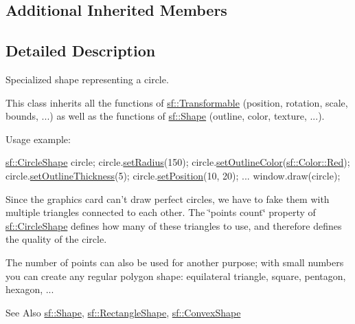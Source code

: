\subsection*{Additional Inherited Members}


\subsection{Detailed Description}
Specialized shape representing a circle. 

This class inherits all the functions of \hyperlink{classsf_1_1_transformable}{sf\-::\-Transformable} (position, rotation, scale, bounds, ...) as well as the functions of \hyperlink{classsf_1_1_shape}{sf\-::\-Shape} (outline, color, texture, ...).

Usage example\-: 
\begin{DoxyCode}
\hyperlink{classsf_1_1_circle_shape}{sf::CircleShape} circle;
circle.\hyperlink{classsf_1_1_circle_shape_a21cdf85fc2f201e10222a241af864be0}{setRadius}(150);
circle.\hyperlink{classsf_1_1_shape_a5978f41ee349ac3c52942996dcb184f7}{setOutlineColor}(\hyperlink{classsf_1_1_color_a7052b1c5408a953e25f9691e0e828c9d}{sf::Color::Red});
circle.\hyperlink{classsf_1_1_shape_a5ad336ad74fc1f567fce3b7e44cf87dc}{setOutlineThickness}(5);
circle.\hyperlink{classsf_1_1_transformable_a4dbfb1a7c80688b0b4c477d706550208}{setPosition}(10, 20);
...
window.draw(circle);
\end{DoxyCode}


Since the graphics card can't draw perfect circles, we have to fake them with multiple triangles connected to each other. The \char`\"{}points count\char`\"{} property of \hyperlink{classsf_1_1_circle_shape}{sf\-::\-Circle\-Shape} defines how many of these triangles to use, and therefore defines the quality of the circle.

The number of points can also be used for another purpose; with small numbers you can create any regular polygon shape\-: equilateral triangle, square, pentagon, hexagon, ...

\begin{DoxySeeAlso}{See Also}
\hyperlink{classsf_1_1_shape}{sf\-::\-Shape}, \hyperlink{classsf_1_1_rectangle_shape}{sf\-::\-Rectangle\-Shape}, \hyperlink{classsf_1_1_convex_shape}{sf\-::\-Convex\-Shape} 
\end{DoxySeeAlso}


